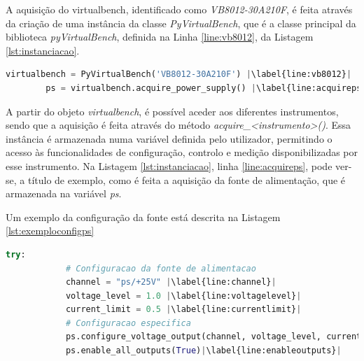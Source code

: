 A aquisição do \acrshort{virtualbench}, identificado como \textit{VB8012-30A210F}, é feita através da criação de uma instância da classe \textit{PyVirtualBench}, que é a classe principal da biblioteca \textit{pyVirtualBench}, definida na Linha \ref{line:vb8012}, da Listagem \ref{lst:instanciacao}.

\begin{center}
\begin{minipage}{0.9\linewidth}
	\begin{lstlisting}[language=Python,escapechar=|, caption=Instanciação da classe \textit{PyVirtualBench}, label=lst:instanciacao]
		virtualbench = PyVirtualBench('VB8012-30A210F') |\label{line:vb8012}|
		ps = virtualbench.acquire_power_supply() |\label{line:acquireps}|
	\end{lstlisting}
\end{minipage}
\end{center}

A partir do objeto \textit{virtualbench}, é possível aceder aos diferentes instrumentos, sendo que a aquisição é feita através do método \textit{acquire\_\textless instrumento\textgreater()}. Essa instância é armazenada numa variável definida pelo utilizador, permitindo o acesso às funcionalidades de configuração, controlo e medição disponibilizadas por esse instrumento. Na Listagem \ref{lst:instanciacao}, linha \ref{line:acquireps}, pode ver-se, a título de exemplo, como é feita a aquisição da fonte de alimentação, que é armazenada na variável \textit{ps}.

Um exemplo da configuração da fonte está descrita na Listagem \ref{lst:exemploconfigps}

\begin{minipage}{0.7\linewidth}
	\begin{lstlisting}[language=Python,escapechar=|, caption=Exemplo \textit{ps\_example.py}, label=lst:exemploconfigps]
		try:
			# Configuracao da fonte de alimentacao
			channel = "ps/+25V" |\label{line:channel}| 
			voltage_level = 1.0 |\label{line:voltagelevel}|
			current_limit = 0.5 |\label{line:currentlimit}|
			# Configuracao especifica
			ps.configure_voltage_output(channel, voltage_level, current_limit)|\label{line:configvoltage}|
			ps.enable_all_outputs(True)|\label{line:enableoutputs}|
	\end{lstlisting}
\end{minipage}

